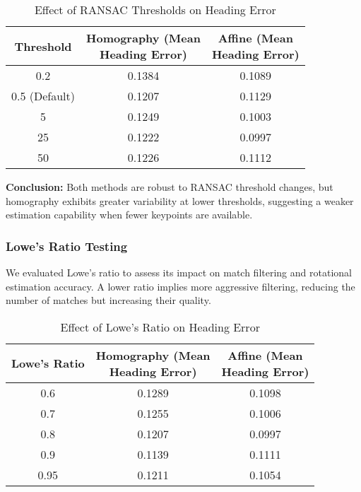 \begin{table}[H]
    \centering
    \begin{tabular}{|c|c|c|}
        \hline
        \textbf{Threshold} & \makecell{\textbf{Homography (Mean} \\ \textbf{Heading Error)}} & \makecell{\textbf{Affine (Mean} \\ \textbf{Heading Error)}} \\
        \hline
        0.2 & 0.1384 & 0.1089 \\  
        0.5 (Default) & 0.1207 & 0.1129 \\  
        5 & 0.1249 & 0.1003 \\  
        25 & 0.1222 & 0.0997 \\  
        50 & 0.1226 & 0.1112 \\  
        \hline
    \end{tabular}
    \caption{Effect of RANSAC Thresholds on Heading Error}
\end{table}

\textbf{Conclusion:} Both methods are robust to RANSAC threshold changes, but homography exhibits greater variability at lower thresholds, suggesting a weaker estimation capability when fewer keypoints are available.

\subsubsection{Lowe's Ratio Testing}
We evaluated Lowe's ratio to assess its impact on match filtering and rotational estimation accuracy. A lower ratio implies more aggressive filtering, reducing the number of matches but increasing their quality.

\begin{table}[H]
    \centering
    \begin{tabular}{|c|c|c|}
        \hline
        \textbf{Lowe's Ratio} & \makecell{\textbf{Homography (Mean} \\ \textbf{Heading Error)}} & \makecell{\textbf{Affine (Mean} \\ \textbf{Heading Error)}} \\
        \hline
        0.6 & 0.1289 & 0.1098 \\  
        0.7 & 0.1255 & 0.1006 \\  
        0.8 & 0.1207 & 0.0997 \\  
        0.9 & 0.1139 & 0.1111 \\  
        0.95 & 0.1211 & 0.1054 \\  
        \hline
    \end{tabular}
    \caption{Effect of Lowe's Ratio on Heading Error}
\end{table}

